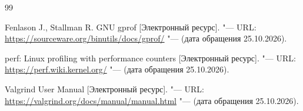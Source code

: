 \clearpage
{}
{}
\begin{thebibliography}{99}
\renewcommand{\bibname}{Список использованных источников}
\raggedright

 Fenlason J., Stallman R. GNU gprof [Электронный ресурс]. "---
URL: \url{https://sourceware.org/binutils/docs/gprof/} "--- (дата обращения
25.10.2026).

 perf: Linux profiling with performance counters
[Электронный ресурс]. "--- URL: \url{https://perf.wiki.kernel.org/} "--- (дата
обращения 25.10.2026).

 Valgrind User Manual [Электронный ресурс]. "--- URL:
\url{https://valgrind.org/docs/manual/manual.html} "--- (дата обращения
25.10.2026).

\end{thebibliography}
